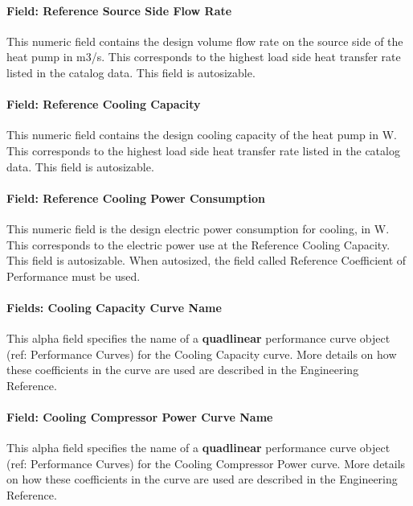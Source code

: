 \paragraph{Field: Reference Source Side Flow Rate}\label{field-rated-source-side-flow-rate}

This numeric field contains the design volume flow rate on the source side of the heat pump in m3/s. This corresponds to the highest load side heat transfer rate listed in the catalog data. This field is autosizable.

\paragraph{Field: Reference Cooling Capacity}\label{field-rated-cooling-capacity}

This numeric field contains the design cooling capacity of the heat pump in W. This corresponds to the highest load side heat transfer rate listed in the catalog data. This field is autosizable.

\paragraph{Field: Reference Cooling Power Consumption}\label{field-rated-cooling-power-consumption}

This numeric field is the design electric power consumption for cooling, in W. This corresponds to the electric power use at the Reference Cooling Capacity. This field is autosizable. When autosized, the field called Reference Coefficient of Performance must be used.

\paragraph{Fields: Cooling Capacity Curve Name}\label{fields-cooling-capacity-curve-name}

This alpha field specifies the name of a \textbf{quadlinear} performance curve object (ref: Performance Curves) for the Cooling Capacity curve. More details on how these coefficients in the curve are used are described in the Engineering Reference.

\paragraph{Field: Cooling Compressor Power Curve Name}\label{field-cooling-compressor-power-curve-name}

This alpha field specifies the name of a \textbf{quadlinear} performance curve object (ref: Performance Curves) for the Cooling Compressor Power curve. More details on how these coefficients in the curve are used are described in the Engineering Reference.

